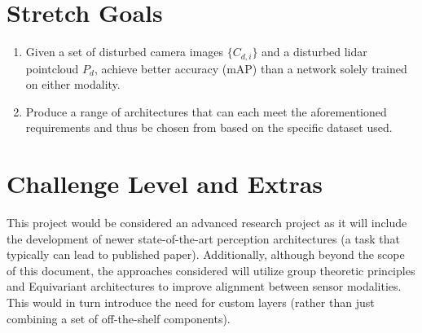 \documentclass{article}
\begin{document}
\section{Stretch Goals}
\begin{enumerate}
    \item Given a set of disturbed camera images $\{C_{d,i}\}$ and a disturbed lidar pointcloud $P_d$, achieve 
    better accuracy (mAP) than a network solely trained on either modality.
    \item Produce a range of architectures that can each meet the aforementioned requirements and thus be chosen from based
    on the specific dataset used. 
\end{enumerate}
\section{Challenge Level and Extras}

This project would be considered an advanced research project as it will include the development
of newer state-of-the-art perception architectures (a task that typically can lead to published paper).
Additionally, although beyond the scope of this document, the approaches considered will utilize group
theoretic principles and Equivariant architectures to improve alignment between sensor modalities. This 
would in turn introduce the need for custom layers (rather than just combining a set of off-the-shelf components).

\newpage{}
\end{document}
